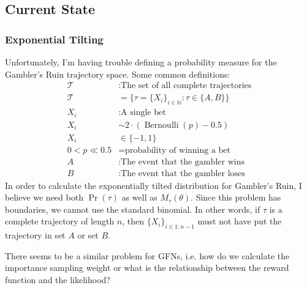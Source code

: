 \documentclass[12pt]{article}
\begin{document}
\newpage
\subsection*{Current State}
\subsubsection*{Exponential Tilting}
Unfortunately, I'm having trouble defining a probability measure for the
Gambler's Ruin trajectory space. Some common definitions:
\[
  \begin{aligned}
    \mathcal{T}
    &:\text{The set of all complete trajectories}
    \\ \mathcal{T} &=\{\tau = \{X_i\}_{i\in\mathbb{N}}: \tau\in \{A,B\}\}
    \\ X_i
    &:\text{A single bet}
    \\X_i &\sim 2\cdot(\operatorname{Bernoulli}\left(p\right)-0.5)
    \\X_i &\in \{-1, 1\} 
    \\ 0 < p \ll 0.5
    &=\text{probability of winning a bet}
    \\ A
    &:\text{The event that the gambler wins}
    \\ B
    &:\text{The event that the gambler loses}
  \end{aligned}
\]
In order to calculate the exponentially tilted distribution for Gambler's Ruin,
I believe we need both $\Pr(\tau)$ as well as $M_\tau(\theta)$. Since this
problem has boundaries, we cannot use the standard binomial. In other words, if
$\tau$ is a complete trajectory of length $n$, then $\{X_i\}_{i\in 1:n-1}$ must
not have put the trajectory in set $A$ or set $B$. 
\par
There seems to be a similar problem for GFNs, i.e. how do we calculate the
importance sampling weight or what is the relationship between the reward
function and the likelihood?
\end{document}
